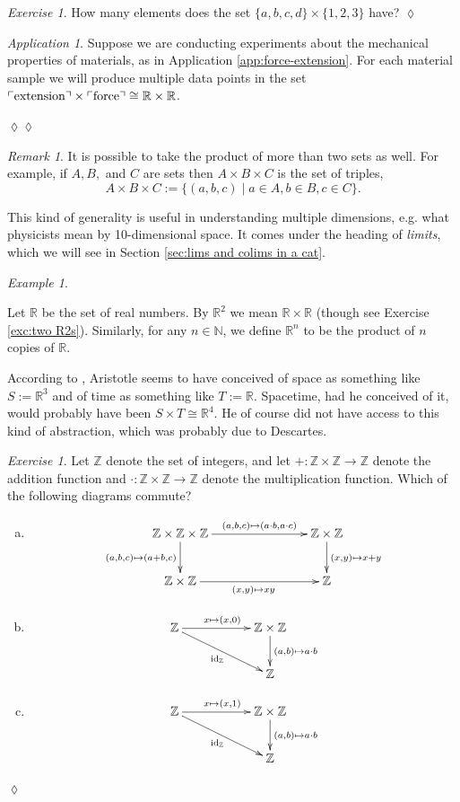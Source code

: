 \documentclass{book}
\def\tn{\textnormal}
\def\ZZ{{\mathbb Z}}
\def\RR{{\mathbb R}}
\def\NN{{\mathbb N}}
\def\hsp{\hspace{.3in}}
\def\to{\rightarrow}
\def\taking{\colon}
\def\iso{\cong}
\def\|{{\;|\;}}
\newcommand{\fakebox}[1]{\tn{$\ulcorner$#1$\urcorner$}}
\def\id{\tn{id}}
\theoremstyle{remark}
\newtheorem{remark}[subsubsection]{Remark}
\newtheorem{example}[subsubsection]{Example}
\newtheorem{exc}[subsubsection]{Exercise}
\newenvironment{exercise}{\begin{exc}}{\hspace*{\fill}$\lozenge$\end{exc}}
\newtheorem{app}[subsubsection]{Application}
\newenvironment{application}{\begin{app}}{\hspace*{\fill}$\lozenge\lozenge$\end{app}}
\theoremstyle{definition}
\def\sexc{\begin{enumerate}[a.)]\setlength{\itemsep}{.1cm}\setlength{\parskip}{.1cm}\item}
\def\next{\item}
\def\endsexc{\end{enumerate}}
\begin{document}
\begin{exercise}
How many elements does the set $\{a,b,c,d\}\times\{1,2,3\}$ have?
\end{exercise}

\begin{application}

Suppose we are conducting experiments about the mechanical properties of materials, as in Application \ref{app:force-extension}. For each material sample we will produce multiple data points in the set $\fakebox{extension}\times\fakebox{force}\iso\RR\times\RR$.

\end{application}

\begin{remark}

It is possible to take the product of more than two sets as well. For example, if $A,B,$ and $C$ are sets then $A\times B\times C$ is the set of triples, 
$$A\times B\times C:=\{(a,b,c)\|a\in A, b\in B, c\in C\}.$$

This kind of generality is useful in understanding multiple dimensions, e.g. what physicists mean by 10-dimensional space. It comes under the heading of {\em limits}, which we will see in Section \ref{sec:lims and colims in a cat}.

\end{remark}

\begin{example}\label{ex:R2}

Let $\RR$\index{a symbol!$\RR$} be the set of real numbers. By $\RR^2$ we mean $\RR\times\RR$ (though see Exercise \ref{exc:two R2s}). Similarly, for any $n\in\NN$, we define $\RR^n$ to be the product of $n$ copies of $\RR$. 

According to \cite{Pen}, Aristotle seems to have conceived of space as something like $S:=\RR^3$ and of time as something like $T:=\RR$. Spacetime, had he conceived of it, would probably have been $S\times T\iso\RR^4$. He of course did not have access to this kind of abstraction, which was probably due to Descartes. 

\end{example}

\begin{exercise}
Let $\ZZ$ denote the set of integers, and let $+\taking\ZZ\times\ZZ\to\ZZ$ denote the addition function and $\cdot\taking\ZZ\times\ZZ\to\ZZ$ denote the multiplication function. Which of the following diagrams commute?
\sexc $$\xymatrix{
\ZZ\times\ZZ\times\ZZ\ar[rr]^-{(a,b,c)\mapsto(a\cdot b,a\cdot c)}\ar[d]_{(a,b,c)\mapsto(a+b,c)}&\hsp&\ZZ\times\ZZ\ar[d]^{(x,y)\mapsto x+y}\\
\ZZ\times\ZZ\ar[rr]_{(x,y)\mapsto xy}&&\ZZ}
$$
\next $$
\xymatrix{
\ZZ\ar[rr]^{x\mapsto (x,0)}\ar[drr]_{\id_\ZZ}&&\ZZ\times\ZZ\ar[d]^{(a,b)\mapsto a\cdot b}\\&&\ZZ}
$$
\next$$
\xymatrix{
\ZZ\ar[rr]^{x\mapsto (x,1)}\ar[drr]_{\id_\ZZ}&&\ZZ\times\ZZ\ar[d]^{(a,b)\mapsto a\cdot b}\\&&\ZZ}
$$
\endsexc
\end{exercise}
\end{document}
